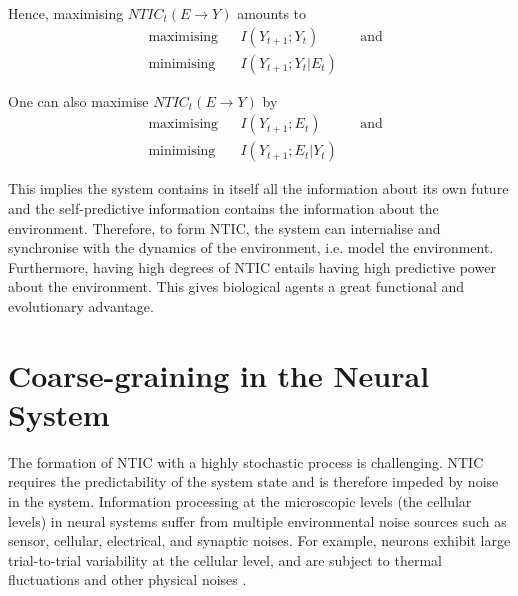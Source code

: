 \documentclass[utf8]{article}
\begin{document}
			\noindent
			Hence, maximising $NTIC_t(E\rightarrow Y)$ amounts to
				\begin{equation}
    				\label{eq:nticObjective}
    				\begin{aligned}
    				& \text{maximising} & { } & I(Y_{t+1};Y_{t}) & { } & \text{and} \\
    				& \text{minimising} & { } & I(Y_{t+1};Y_{t}|E_{t}) & { }
    				\end{aligned}
				\end{equation}
				
			One can also maximise $NTIC_t(E\rightarrow Y)$ by 
				\begin{equation}
    				\label{eq:nticObjective2}
    				\begin{aligned}
    				& \text{maximising} & { } & I(Y_{t+1};E_{t}) & { } & \text{and} \\
    				& \text{minimising} & { } & I(Y_{t+1};E_{t}|Y_{t}) & { }
    				\end{aligned}
				\end{equation}			

			\noindent
			This implies the system contains in itself all the information about its own future and the self-predictive information contains the information about the environment. Therefore, to form NTIC, the system can internalise and synchronise with the dynamics of the environment, i.e. model the environment. Furthermore, having high degrees of NTIC entails having high predictive power about the environment. This gives biological agents a great functional and evolutionary advantage. 
			

	\section{Coarse-graining in the Neural System} \label{sec:Neural coarse-graining}

		The formation of NTIC with a  highly stochastic process is challenging. NTIC requires the predictability of the system state and is therefore impeded by noise in the system. Information processing at the microscopic levels (the cellular levels) in neural systems suffer from multiple environmental noise sources such as sensor, cellular, electrical, and synaptic noises. For example, neurons exhibit large trial-to-trial variability at the cellular level, and are subject to thermal fluctuations and other physical noises \citep{faisal2008noise}. 
		
\end{document}
